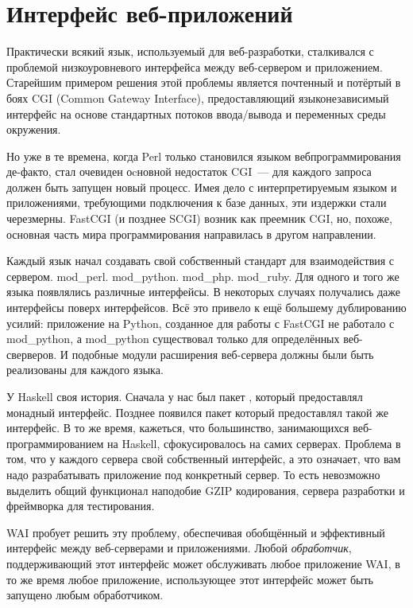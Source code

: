 \chapter{Интерфейс веб-приложений}\label{chap:web_application_interface}

Практически всякий язык, используемый для веб-разработки, сталкивался с проблемой
низкоуровневого интерфейса между веб-сервером и приложением. Старейшим примером
решения этой проблемы является почтенный и потёртый в боях CGI (Common Gateway Interface), 
предоставляющий языконезависимый интерфейс на основе стандартных потоков ввода/вывода и переменных среды окружения.

Но уже в те времена, когда Perl только становился языком вебпрограммирования де-факто, стал очевиден оcновной недостаток CGI~--- для каждого запроса должен быть запущен новый процесс. Имея дело с интерпретируемым языком и приложениями, требующими подключения к базе
данных, эти издержки стали черезмерны. FastCGI (и позднее SCGI) возник как преемник
CGI, но, похоже, основная часть мира программирования направилась в другом направлении.

Каждый язык начал создавать свой собственный стандарт для взаимодействия с сервером.
mod\_perl. mod\_python. mod\_php. mod\_ruby. Для одного и того же языка появлялись различные
интерфейсы. В некоторых случаях получались даже интерфейсы поверх интерфейсов.
Всё это привело к ещё большему дублированию усилий: приложение на Python, созданное
для работы с FastCGI не работало с mod\_python, а mod\_python существовал только для
определённых веб-сверверов. И подобные модули расширения веб-сервера должны были быть реализованы для каждого языка.

У Haskell своя история. Сначала у нас был пакет , 
который предоставлял монадный интерфейс. Позднее появился пакет  который
предоставлял такой же интерфейс. В то же время, кажеться, что большинство,
занимающихся веб-программированием на Haskell, сфокусировалось на самих серверах.
Проблема в том, что у каждого сервера свой собственный интерфейс, а это означает, что 
вам надо разрабатывать приложение под конкретный сервер. То есть невозможно выделить
общий функционал наподобие GZIP кодирования, сервера разработки и фреймворка для тестирования.

WAI пробует решить эту проблему, обеспечивая обобщённый и эффективный интерфейс между
веб-серверами и приложениями. Любой \emph{обработчик}, поддерживающий этот интерфейс может обслуживать
любое приложение WAI, в то же время любое приложение, использующее этот интерфейс может быть запущено любым обработчиком.

